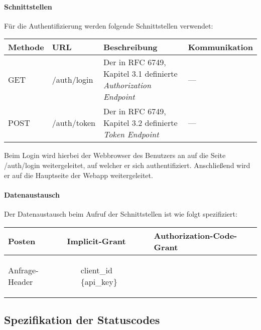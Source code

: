 \paragraph{Schnittstellen}
Für die Authentifizierung werden folgende Schnittstellen verwendet:
\begin{table}
\begin{tabularx}{\textwidth}{@{} | X | X | X | X | @{}}
	\hline
	\textbf{Methode} & \textbf{URL} & \textbf{Beschreibung} & \textbf{Kommunikation} \\ \hline \hline
	GET & /auth/login & Der in RFC 6749, Kapitel 3.1 definierte \textit{Authorization Endpoint} & --- \\ \hline
	POST & /auth/token & Der in RFC 6749, Kapitel 3.2 definierte \textit{Token Endpoint} & --- \\ \hline
\end{tabularx}
\end{table}
Beim Login wird hierbei der Webbrowser des Benutzers an auf die Seite /auth/login weitergeleitet, auf welcher er sich authentifiziert. Anschließend wird er auf die Hauptseite der Webapp weitergeleitet.
\paragraph{Datenaustausch}
Der Datenaustausch beim Aufruf der Schnittstellen ist wie folgt spezifiziert:\\
\begin{tabularx}{\textwidth}{@{} | X | X | X | @{}}
	\hline
	\textbf{Posten} & \textbf{Implicit-Grant} & \textbf{Authorization-Code-Grant} \\ \hline
	Anfrage-Header &
	\begin{itemize}
		\item[]
		\item[client\_id] \{api\_key\}
	\end{itemize} & \\
\end{tabularx}
\subsection{Spezifikation der Statuscodes}
